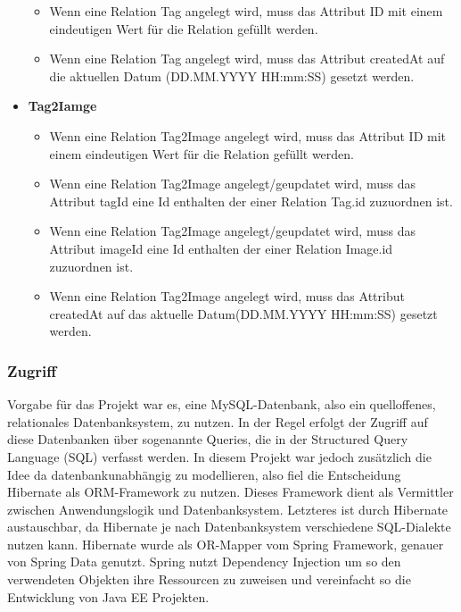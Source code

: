 \documentclass[12pt, oneside, a4paper]{article}		%
\begin{document}
\begin{itemize}
	\begin{itemize}
		\item Wenn eine Relation Tag angelegt wird, muss das Attribut ID mit einem eindeutigen Wert für die Relation gefüllt werden.
		\item Wenn eine Relation Tag angelegt wird, muss das Attribut createdAt auf die aktuellen Datum (DD.MM.YYYY HH:mm:SS) gesetzt werden.
	\end{itemize}
	\item \textbf{Tag2Iamge}
	\begin{itemize}
		\item Wenn eine Relation Tag2Image angelegt wird, muss das Attribut ID mit einem eindeutigen Wert für die Relation gefüllt werden.
		\item Wenn eine Relation Tag2Image angelegt/geupdatet wird, muss das Attribut tagId eine Id enthalten der einer Relation Tag.id zuzuordnen ist.
		\item Wenn eine Relation Tag2Image angelegt/geupdatet wird, muss das Attribut imageId eine Id enthalten der einer Relation Image.id zuzuordnen ist.
		\item Wenn eine Relation Tag2Image angelegt wird, muss das Attribut createdAt auf das aktuelle Datum(DD.MM.YYYY HH:mm:SS) gesetzt werden.
	\end{itemize}
\end{itemize}

\subsubsection{Zugriff}

Vorgabe für das Projekt war es, eine MySQL-Datenbank, also ein quelloffenes, relationales Datenbanksystem, zu nutzen. In der Regel erfolgt der Zugriff auf diese Datenbanken über sogenannte Queries, die in der Structured Query Language (SQL) verfasst werden. In diesem Projekt war jedoch zusätzlich die Idee da datenbankunabhängig zu modellieren, also fiel die Entscheidung Hibernate als ORM-Framework zu nutzen. Dieses Framework dient als Vermittler zwischen Anwendungslogik und Datenbanksystem. Letzteres ist durch Hibernate austauschbar, da Hibernate je nach Datenbanksystem verschiedene SQL-Dialekte nutzen kann.
Hibernate wurde als OR-Mapper vom Spring Framework, genauer von Spring Data genutzt. Spring nutzt Dependency Injection um so den verwendeten Objekten ihre Ressourcen zu zuweisen und vereinfacht so die Entwicklung von Java EE Projekten.
\end{document}
